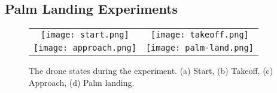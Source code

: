 \subsection{Palm Landing Experiments}
\begin{figure}
    \begin{tabular}{cc}
      \centering
      \begin{minipage}[t]{0.45 \columnwidth}
        \centering
        \texttt{[image: start.png]}
        \subcaption{}
        \label{fig:start}
      \end{minipage}&
      \begin{minipage}[t]{0.45 \columnwidth}
        \centering
        \texttt{[image: takeoff.png]}
        \subcaption{}
        \label{fig:takeoff}
      \end{minipage} \\
      \begin{minipage}[t]{0.45 \columnwidth}
        \centering
        \texttt{[image: approach.png]}
        \subcaption{}
        \label{fig:approach}
      \end{minipage}&
      \begin{minipage}[t]{0.45 \columnwidth}
        \centering
        \texttt{[image: palm-land.png]}
        \subcaption{}
        \label{fig:palm-land}
      \end{minipage}      
    \end{tabular}
    \caption{The drone states during the experiment. (a) Start, (b) Takeoff, (c) Approach, (d) Palm landing.}
    \label{fig:states}
\end{figure}


